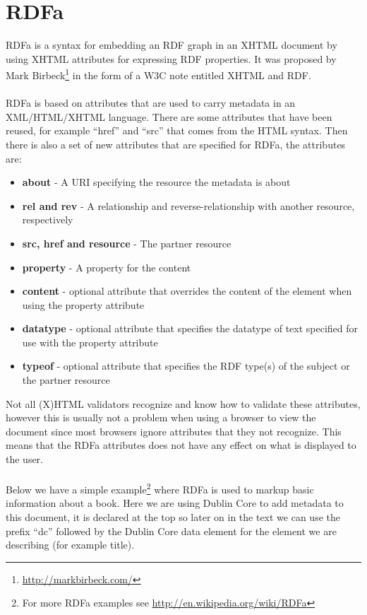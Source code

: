 \section{RDFa}
RDFa is a syntax for embedding an RDF graph in an XHTML document by using XHTML attributes for expressing RDF properties. It was proposed by Mark Birbeck\footnote{\url{http://markbirbeck.com/}} in the form of a W3C note entitled XHTML and RDF\cite{rdfaBib}.\\\\
RDFa is based on attributes that are used to carry metadata in an XML/HTML/XHTML language. There are some attributes that have been reused, for example “href” and “src” that comes from the HTML syntax. Then there is also a set of new attributes that are specified for RDFa, the attributes are:\cite{rdfaBib2}
\begin{itemize}
\item \textbf{about} - A URI specifying the resource the metadata is about
\item \textbf{rel and rev} - A relationship and reverse-relationship with another resource, respectively
\item \textbf{src, href and resource} - The partner resource
\item \textbf{property} - A property for the content
\item \textbf{content} - optional attribute that overrides the content of the element when using the property attribute
\item \textbf{datatype} - optional attribute that specifies the datatype of text specified for use with the property attribute
\item \textbf{typeof} - optional attribute that specifies the RDF type(s) of the subject or the partner resource
\end{itemize}
Not all (X)HTML validators recognize and know how to validate these attributes, however this is usually not a problem when using a browser to view the document since most browsers ignore attributes that they not recognize. This means that the RDFa attributes does not have any effect on what is displayed to the user.\\\\
Below we have a simple example\footnote{For more RDFa examples see \url{http://en.wikipedia.org/wiki/RDFa}} where RDFa is used to markup basic information about a book. Here we are using Dublin Core to add metadata to this document, it is declared at the top so later on in the text we can use the prefix “dc” followed by the Dublin Core data element for the element we are describing (for example title).\\  
